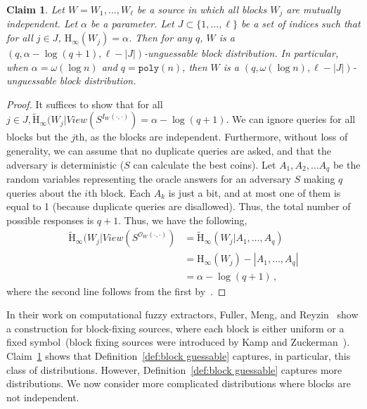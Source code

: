 \documentclass[11pt]{article}
\newcommand{\defref}[1]{\mbox{Definition~\ref{#1}}}
\newcommand{\clref}[1]{\mbox{Claim~\ref{#1}}}
\newcommand{\poly}{\ensuremath{\mathtt{poly}}\xspace}
\newcommand{\Hoo}{\mathrm{H}_\infty}
\newcommand{\Hav}{\tilde{\mathrm{H}}_\infty}
\newtheorem{claim}[theorem]{Claim}
\begin{document}
\begin{claim}
\label{cl:independent high ent}
Let $W = W_1,  ... , W_\ell$ be a source in which all blocks $W_j$  are mutually independent.  Let $\alpha$ be a parameter.  Let $J\subset \{1,..., \ell\}$ be a set of indices such that for all $j\in J$, $\Hoo(W_j ) =\alpha $.  Then for any $q$, $W$ is a $(q, \alpha - \log (q+1), \ell - |J|)$-unguessable block distribution.  In particular, when $\alpha = \omega(\log n)$ and $q = \poly(n)$, then $W$ is a $(q, \omega(\log n), \ell - |J|)$-unguessable block distribution.
\end{claim}
\begin{proof}
It suffices to show that for all $j\in J, \Hav(W_j |View(S^{I_{W}(\cdot, \cdot)}) = \alpha -\log (q+1)$.
We can ignore queries for all blocks but the $j$th, as the blocks are independent. Furthermore, without loss of generality, we can assume that no duplicate queries are asked, and that the adversary is deterministic ($S$ can calculate the best coins). Let $A_1, A_2, \dots A_q$ be the random variables representing the oracle answers for an  adversary $S$ making $q$  queries about the $i$th block. Each $A_k$ is just a bit, and at most one of them  is equal to 1 (because duplicate queries are disallowed). Thus, the total number of possible responses is $q+1$. Thus, we have the following,
\begin{align*}
\Hav(W_j | View(S^{\mathcal{O}_{W}(\cdot, \cdot)}) &= \Hav(W_j| A_1, \dots, A_q)\\
&=\Hoo(W_j) - |A_1, \dots, A_q|\\
&=\alpha - \log (q+1)\,,
\end{align*}
where the second line follows from the first by~\cite[Lemma 2.2]{DBLP:journals/siamcomp/DodisORS08}.
\end{proof}
\noindent In their work on computational fuzzy extractors, Fuller, Meng, and Reyzin~\cite{fuller2013computational} show a construction for block-fixing sources, where each block is either uniform or a fixed symbol~(block fixing sources were introduced by Kamp and Zuckerman~\cite{KZ07}).  \clref{cl:independent high ent} shows that \defref{def:block guessable} captures, in particular, this class of distributions.
However, \defref{def:block guessable} captures more distributions.  We now consider more complicated distributions where blocks are not independent.
\end{document}
